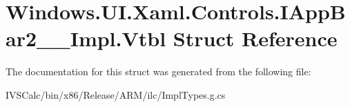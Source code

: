 \hypertarget{struct_windows_1_1_u_i_1_1_xaml_1_1_controls_1_1_i_app_bar2_____impl_1_1_vtbl}{}\section{Windows.\+U\+I.\+Xaml.\+Controls.\+I\+App\+Bar2\+\_\+\+\_\+\+Impl.\+Vtbl Struct Reference}
\label{struct_windows_1_1_u_i_1_1_xaml_1_1_controls_1_1_i_app_bar2_____impl_1_1_vtbl}


The documentation for this struct was generated from the following file\+:\begin{DoxyCompactItemize}
\item 
I\+V\+S\+Calc/bin/x86/\+Release/\+A\+R\+M/ilc/Impl\+Types.\+g.\+cs\end{DoxyCompactItemize}
